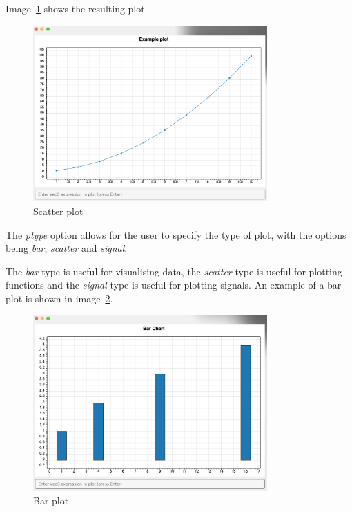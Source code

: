 Image~\ref{fig:scatter-plot} shows the resulting plot.

\begin{figure}[H]
    \centering
    \includegraphics[width=0.8\textwidth]{scatterPlot}
    \caption{Scatter plot}\label{fig:scatter-plot}
\end{figure}

The \textit{ptype} option allows for the user to specify the type of plot, with the options being \textit{bar},
\textit{scatter} and \textit{signal}.

The \textit{bar} type is useful for visualising data, the \textit{scatter} type is useful for plotting functions and
the \textit{signal} type is useful for plotting signals.
An example of a bar plot is shown in image~\ref{fig:bar-plot}.

\begin{figure}[H]
    \centering
    \includegraphics[width=0.8\textwidth]{barChart}
    \caption{Bar plot}\label{fig:bar-plot}
\end{figure}

